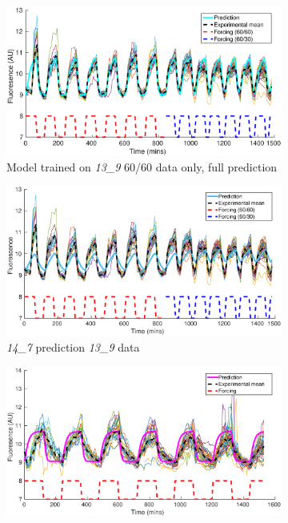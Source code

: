 \documentclass[10pt,journal]{./IEEE_latex_class/IEEEtran}
\begin{document}
 
 \begin{figure}[h!]	
 	\begin{subfigure}[h]{0.49\textwidth}
    \centering
        \includegraphics[scale = 0.3,clip = true, trim = 70 0 70 0]{13_9_partial_data_13_9_pred}
        \caption{Model trained on \textit{13\_9}  60/60 data only, full prediction}
        \label{CrossValidation_1} 
    \end{subfigure}
	\begin{subfigure}[h]{0.49\textwidth}
    \centering
        \includegraphics[scale = 0.3,clip = true, trim = 70 0 70 0]{14_7_pred_13_9_data}
        \caption{\textit{14\_7} prediction \textit{13\_9} data}
        \label{CrossValidation_2} 
    \end{subfigure}
    \begin{subfigure}[h]{0.49\textwidth}
    \centering
        \includegraphics[scale = 0.3,clip = true, trim = 70 0 70 0]{13_9_pred_14_7_data}

\end{subfigure}
\end{figure}
\end{document}
